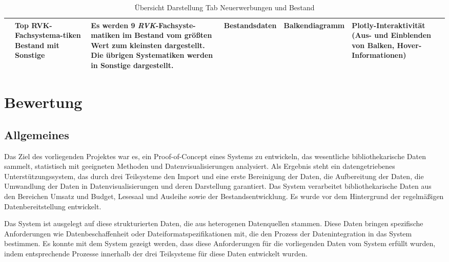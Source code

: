 \begin{table}[H]
\begin{adjustbox}{max width=\textwidth}
\begin{tabular}{p{}p{}p{}p{}p{}p{}}
                        &Top RVK-Fachsystema-tiken Bestand mit Sonstige&Es werden  9 \textit{\acrshort{RVK}}-Fachsyste-matiken im Bestand vom größten Wert zum kleinsten dargestellt. Die übrigen Systematiken werden in Sonstige dargestellt.&Bestandsdaten&Balkendiagramm&Plotly-Interaktivität (Aus- und Einblenden von Balken, Hover-Informationen)\\

        \bottomrule
        \end{tabular}
        \end{adjustbox}
        \caption{%
            Übersicht Darstellung Tab Neuerwerbungen und Bestand
        }
        \label{tab:Darstellung Tab Neuerwerbungen und Bestand}
        \end{table}
    \endgroup

\section{Bewertung}

\subsection{Allgemeines}
\label{chap:five_three_one}
Das Ziel des vorliegenden Projektes war es, ein Proof-of-Concept eines Systems zu entwickeln, 
das wesentliche bibliothekarische Daten sammelt, statistisch mit geeigneten Methoden und
Datenvisualisierungen analysiert. Als Ergebnis steht ein datengetriebenes 
Unterstützungssystem, das durch drei Teilsysteme den Import und eine erste Bereinigung der Daten,
die Aufbereitung der Daten, die Umwandlung der Daten in Datenvisualisierungen und deren Darstellung garantiert. 
Das System verarbeitet bibliothekarische Daten aus den Bereichen Umsatz und Budget, Lesesaal und Ausleihe 
sowie der Bestandsentwicklung. Es wurde vor dem Hintergrund der regelmäßigen Datenbereitstellung entwickelt.

Das System ist ausgelegt auf diese strukturierten Daten, die aus heterogenen Datenquellen stammen.
Diese Daten bringen spezifische Anforderungen wie Datenbeschaffenheit oder Dateiformatspezifikationen mit, 
die den Prozess der Datenintegration in das System bestimmen. Es konnte mit dem System gezeigt werden, 
dass diese Anforderungen für die vorliegenden Daten vom System erfüllt wurden, indem entsprechende Prozesse innerhalb
der drei Teilsysteme für diese Daten entwickelt wurden.

